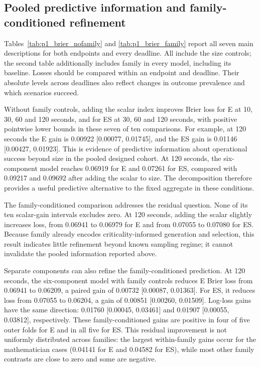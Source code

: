 \subsection{Pooled predictive information and family-conditioned refinement}
Tables~\ref{tab:p1_brier_nofamily} and \ref{tab:p1_brier_family}
report all seven main descriptions for both endpoints and every deadline.
All include the size controls; the second table additionally includes
family in every model, including its baseline. Losses should be compared
within an endpoint and deadline. Their absolute levels across deadlines
also reflect changes in outcome prevalence and which scenarios succeed.

Without family controls, adding the scalar index improves Brier loss for E
at 10, 30, 60 and 120 seconds, and for ES at 30, 60 and 120 seconds,
with positive pointwise lower bounds in these seven of ten comparisons.
For example, at 120 seconds the E gain is 0.00922
[0.00077, 0.01745], and the ES gain is 0.01146
[0.00427, 0.01923]. This is evidence of predictive information about
operational success beyond size in the pooled designed cohort. At
120 seconds, the six-component model reaches 0.06919 for E and 0.07261
for ES, compared with 0.09217 and 0.09692 after adding the scalar
to size. The decomposition therefore provides a useful predictive
alternative to the fixed aggregate in these conditions.

The family-conditioned comparison addresses the residual question.
None of its ten scalar-gain intervals excludes zero. At 120 seconds,
adding the scalar slightly increases loss, from 0.06941 to 0.06979
for E and from 0.07055 to 0.07080 for ES. Because family already
encodes criticality-informed generation and selection, this result
indicates little refinement beyond known sampling regime; it cannot
invalidate the pooled information reported above.

Separate components can also refine the family-conditioned prediction.
At 120 seconds, the six-component model with family controls reduces E
Brier loss from 0.06941 to 0.06209, a paired gain of 0.00732
[0.00087, 0.01363]. For ES, it reduces loss from 0.07055 to 0.06204,
a gain of 0.00851 [0.00260, 0.01509]. Log-loss gains have the same
direction: 0.01760 [0.00045, 0.03461] and
0.01907 [0.00055, 0.03812], respectively.
These family-conditioned gains are positive in four of five outer folds
for E and in all five for ES. This residual improvement is not
uniformly distributed across families:
the largest within-family gains occur for the mathematician cases
(0.04141 for E and 0.04582 for ES), while most other family contrasts
are close to zero and some are negative.

